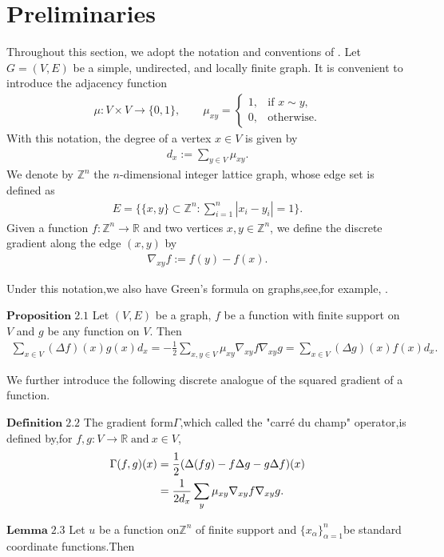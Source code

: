 \documentclass[11pt]{article}
\theoremstyle{definition}
\theoremstyle{remark}
\numberwithin{equation}{section}
\begin{document}
\section{Preliminaries}
\noindent
Throughout this section, we adopt the notation and conventions of \cite{hua2023payne}.
Let $G=(V,E)$ be a simple, undirected, and locally finite graph.
It is convenient to introduce the adjacency function
\begin{align*}
\mu : V \times V \to \{0,1\}, \qquad
\mu_{xy} =
\begin{cases}
1, & \text{if } x \sim y, \\
0, & \text{otherwise}.
\end{cases}
\end{align*}
With this notation, the degree of a vertex $x \in V$ is given by
\begin{align*}
d_x := \sum_{y \in V} \mu_{xy}.
\end{align*}
\noindent
We denote by $\mathbb{Z}^n$ the $n$-dimensional integer lattice graph, whose edge set is defined as
\begin{align*}
E
=
\bigl\{
\{x,y\} \subset \mathbb{Z}^n :
\sum_{i=1}^{n} |x_i - y_i| = 1
\bigr\}.
\end{align*}
\noindent
Given a function $f : \mathbb{Z}^n \to \mathbb{R}$ and two vertices $x,y \in \mathbb{Z}^n$,
we define the discrete gradient along the edge $(x,y)$ by
\begin{align*}
\nabla_{xy} f := f(y) - f(x).
\end{align*}
\par
Under this notation,we also have Green's formula on graphs,see,for example, \cite{grigor2018introduction}.\par\noindent
$\mathbf{Proposition\; 2.1}$ Let $(V,E)$ be a graph, $f$ be a function with finite support on $V$ and $g$ be any function
on $V$. Then
\begin{align}
\sum_{x\in V}(\Delta f)(x)g(x)d_x=-\frac{1}{2}\sum_{x,y \in V}\mu_{xy}\nabla_{xy}f\nabla_{xy}g=\sum_{x\in V}(\Delta g)(x)f(x)d_x.
\end{align}\par
We further introduce the following discrete analogue of the squared gradient of a function.
 \par\noindent
$\mathbf{ Definition\; 2.2}$ The gradient form\:$\Gamma$\:,which called the "carré du champ" operator,is defined by,for $f,g:V \rightarrow \mathbb{R} \;\text{and}\: x\in V$,
 \begin{align}\label{eq:2.2}
  \Gamma(f,g)(x)&=\frac{1}{2}(\Delta(fg)-f\Delta g-g\Delta f)(x)\notag\\&=\frac{1}{2d_x}\sum_{y}\mu_{xy} \nabla_{xy}f\nabla_{xy}g. \end{align}\par\noindent
 $\mathbf{Lemma \; 2.3}$ Let $u$ be a function on\:$ \mathbb{Z}^n$ \:of finite support and $\{x_\alpha\}_{\alpha =1}^{n}$be standard coordinate functions.Then\par\noindent
\end{document}
